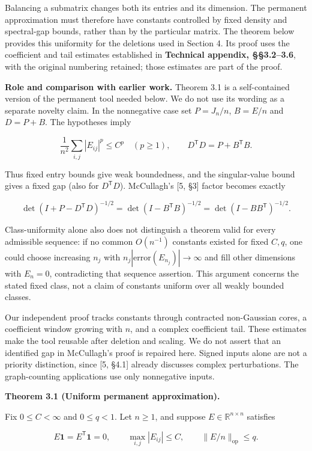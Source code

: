 \documentclass[11pt,a4paper]{article}
\begin{document}
Balancing a submatrix changes both its entries and its dimension. The permanent approximation must therefore have constants controlled by fixed density and spectral-gap bounds, rather than by the particular matrix. The theorem below provides this uniformity for the deletions used in Section 4. Its proof uses the coefficient and tail estimates established in \textbf{Technical appendix, §§3.2--3.6}, with the original numbering retained; those estimates are part of the proof.

\textbf{Role and comparison with earlier work.} Theorem 3.1 is a self-contained version of the permanent tool needed below. We do not use its wording as a separate novelty claim. In the nonnegative case set \(P=J_n/n\), \(B=E/n\) and \(D=P+B\). The hypotheses imply

\[
\frac1{n^2}\sum_{i,j}|E_{ij}|^p\le C^p\quad(p\ge1),\qquad
D^{\mathsf T}D=P+B^{\mathsf T}B.
\]

Thus fixed entry bounds give weak boundedness, and the singular-value bound gives a fixed gap (also for \(D^{\mathsf T}D\)). McCullagh's {[}5, §3{]} factor becomes exactly

\[
\det(I+P-D^{\mathsf T}D)^{-1/2}
=\det(I-B^{\mathsf T}B)^{-1/2}
=\det(I-BB^{\mathsf T})^{-1/2}.
\]

Class-uniformity alone also does not distinguish a theorem valid for every admissible sequence: if no common \(O(n^{-1})\) constants existed for fixed \(C,q\), one could choose increasing \(n_j\) with \(n_j|\mathrm{error}(E_{n_j})|\to\infty\) and fill other dimensions with \(E_n=0\), contradicting that sequence assertion. This argument concerns the stated fixed class, not a claim of constants uniform over all weakly bounded classes.

Our independent proof tracks constants through contracted non-Gaussian cores, a coefficient window growing with \(n\), and a complex coefficient tail. These estimates make the tool reusable after deletion and scaling. We do not assert that an identified gap in McCullagh's proof is repaired here. Signed inputs alone are not a priority distinction, since {[}5, §4.1{]} already discusses complex perturbations. The graph-counting applications use only nonnegative inputs.

\textbf{Theorem 3.1 (Uniform permanent approximation).}

Fix \(0\le C<\infty\) and \(0\le q<1\). Let \(n\ge1\), and suppose \(E\in\mathbb R^{n\times n}\) satisfies

\[
E\mathbf1=E^{\mathsf T}\mathbf1=0,\qquad
\max_{i,j}|E_{ij}|\le C,\qquad
\|E/n\|_{\mathrm{op}}\le q.
\]
\end{document}
